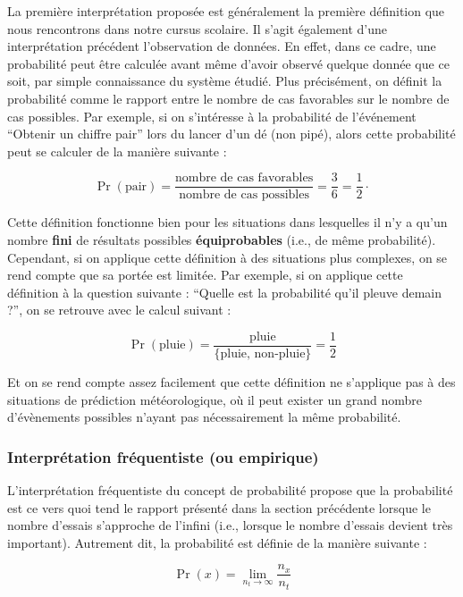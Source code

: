 \documentclass[
  a4paper,11pt,twoside,onecolumn,openright,final,oldfontcommands]{memoir}
\theoremstyle{definition}
\theoremstyle{definition}
\theoremstyle{definition}
\theoremstyle{definition}
\theoremstyle{remark}
\begin{document}
La première interprétation proposée est généralement la première définition que nous rencontrons dans notre cursus scolaire. Il s'agit également d'une interprétation précédent l'observation de données. En effet, dans ce cadre, une probabilité peut être calculée avant même d'avoir observé quelque donnée que ce soit, par simple connaissance du système étudié. Plus précisément, on définit la probabilité comme le rapport entre le nombre de cas favorables sur le nombre de cas possibles. Par exemple, si on s'intéresse à la probabilité de l'événement ``Obtenir un chiffre pair'' lors du lancer d'un dé (non pipé), alors cette probabilité peut se calculer de la manière suivante :

\[
\Pr(\text{pair}) = \frac{\text{nombre de cas favorables}}{\text{nombre de cas possibles}} = \frac{3}{6} = \frac{1}{2} \cdot
\]

Cette définition fonctionne bien pour les situations dans lesquelles il n'y a qu'un nombre \textbf{fini} de résultats possibles \textbf{équiprobables} (i.e., de même probabilité). Cependant, si on applique cette définition à des situations plus complexes, on se rend compte que sa portée est limitée. Par exemple, si on applique cette définition à la question suivante : ``Quelle est la probabilité qu'il pleuve demain ?'', on se retrouve avec le calcul suivant :

\[
\Pr(\text{pluie}) = \frac{\text{pluie}}{ \{\text{pluie, non-pluie} \} } = \frac{1}{2}
\]

Et on se rend compte assez facilement que cette définition ne s'applique pas à des situations de prédiction météorologique, où il peut exister un grand nombre d'évènements possibles n'ayant pas nécessairement la même probabilité.

\hypertarget{interpruxe9tation-fruxe9quentiste-ou-empirique}{%
\subsubsection{Interprétation fréquentiste (ou empirique)}\label{interpruxe9tation-fruxe9quentiste-ou-empirique}}

L'interprétation fréquentiste du concept de probabilité propose que la probabilité est ce vers quoi tend le rapport présenté dans la section précédente lorsque le nombre d'essais s'approche de l'infini (i.e., lorsque le nombre d'essais devient très important). Autrement dit, la probabilité est définie de la manière suivante :

\[\Pr(x) = \lim_{n_{t} \to \infty}\frac{n_{x}}{n_{t}}\]
\end{document}
